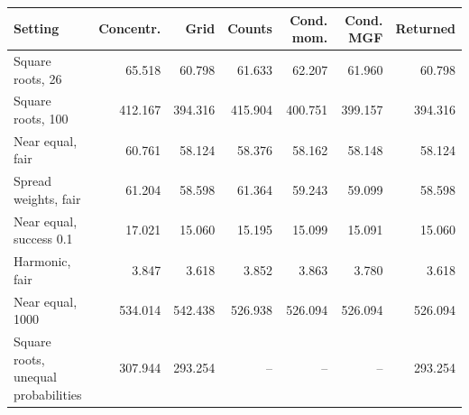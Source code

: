 \begin{tabular}{lrrrrrr}
\toprule
Setting & Concentr. & Grid & Counts & Cond. mom. & Cond. MGF & Returned \\
\midrule
Square roots, 26 & 65.518 & 60.798 & 61.633 & 62.207 & 61.960 & 60.798 \\
Square roots, 100 & 412.167 & 394.316 & 415.904 & 400.751 & 399.157 & 394.316 \\
Near equal, fair & 60.761 & 58.124 & 58.376 & 58.162 & 58.148 & 58.124 \\
Spread weights, fair & 61.204 & 58.598 & 61.364 & 59.243 & 59.099 & 58.598 \\
Near equal, success 0.1 & 17.021 & 15.060 & 15.195 & 15.099 & 15.091 & 15.060 \\
Harmonic, fair & 3.847 & 3.618 & 3.852 & 3.863 & 3.780 & 3.618 \\
Near equal, 1000 & 534.014 & 542.438 & 526.938 & 526.094 & 526.094 & 526.094 \\
Square roots, unequal probabilities & 307.944 & 293.254 & -- & -- & -- & 293.254 \\
\bottomrule
\end{tabular}
